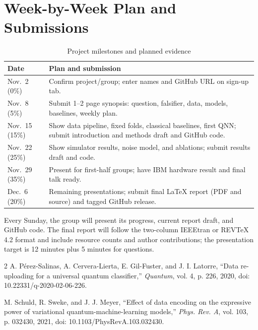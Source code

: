 \documentclass[conference]{IEEEtran}
\begin{document}
\section{Week-by-Week Plan and Submissions}
\begin{table}[!t]
\caption{Project milestones and planned evidence}
\label{tab:timeline}
\centering
\footnotesize
\begin{tabular}{p{}p{}}
\hline
\textbf{Date} & \textbf{Plan and submission}\\
\hline
Nov.\ 2 (0\%) & Confirm project/group; enter names and GitHub URL on sign-up tab.\\
Nov.\ 8 (5\%) & Submit 1--2 page synopsis: question, falsifier, data, models, baselines, weekly plan.\\
Nov.\ 15 (15\%) & Show data pipeline, fixed folds, classical baselines, first QNN; submit introduction and methods draft and GitHub code.\\
Nov.\ 22 (25\%) & Show simulator results, noise model, and ablations; submit results draft and code.\\
Nov.\ 29 (35\%) & Present for first-half groups; have IBM hardware result and final talk ready.\\
Dec.\ 6 (20\%) & Remaining presentations; submit final LaTeX report (PDF and source) and tagged GitHub release.\\
\hline
\end{tabular}
\end{table}
Every Sunday, the group will present its progress, current report draft, and
GitHub code. The final report will follow the two-column IEEEtran or
REV\TeX{} 4.2 format and include resource counts and author contributions;
the presentation target is 12 minutes plus 5 minutes for questions.

\begin{thebibliography}{2}
A. P\'erez-Salinas, A. Cervera-Lierta, E. Gil-Fuster, and J. I. Latorre,
``Data re-uploading for a universal quantum classifier,''
\emph{Quantum}, vol. 4, p. 226, 2020, doi: 10.22331/q-2020-02-06-226.

M. Schuld, R. Sweke, and J. J. Meyer, ``Effect of data encoding on the
expressive power of variational quantum-machine-learning models,''
\emph{Phys. Rev. A}, vol. 103, p. 032430, 2021,
doi: 10.1103/PhysRevA.103.032430.
\end{thebibliography}
\end{document}
